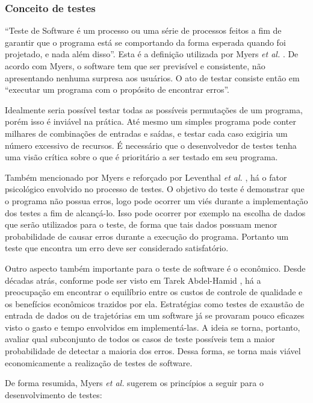 \hypertarget{conceito-de-testes}{%
\subsubsection{Conceito de testes}\label{conceito-de-testes}}

``Teste de Software é um processo ou uma série de processos feitos a fim de garantir que o programa está se comportando da forma esperada quando foi projetado, e nada além disso''. Esta é a definição utilizada por Myers \emph{et al.} \cite{myers}. De acordo com Myers, o software tem que ser previsível e consistente, não apresentando nenhuma surpresa aos usuários. O ato de testar consiste então em ``executar um programa com o propósito de encontrar erros''.

Idealmente seria possível testar todas as possíveis permutações de um programa, porém isso é inviável na prática. Até mesmo um simples programa pode conter milhares de combinações de entradas e saídas, e testar cada caso exigiria um número excessivo de recursos. É necessário que o desenvolvedor de testes tenha uma visão crítica sobre o que é prioritário a ser testado em seu programa.

Também mencionado por Myers e reforçado por Leventhal \emph{et al.} \cite{leventhal}, há o fator psicológico envolvido no processo de testes. O objetivo do teste é demonstrar que o programa não possua erros, logo pode ocorrer um viés durante a implementação dos testes a fim de alcançá-lo. Isso pode ocorrer por exemplo na escolha de dados que serão utilizados para o teste, de forma que tais dados possuam menor probabilidade de causar erros durante a execução do programa. Portanto um teste que encontra um erro deve ser considerado satisfatório.

Outro aspecto também importante para o teste de software é o econômico. Desde décadas atrás, conforme pode ser visto em Tarek Abdel-Hamid \cite{abdel}, há a preocupação em encontrar o equilíbrio entre os custos de controle de qualidade e os benefícios econômicos trazidos por ela. Estratégias como testes de exaustão de entrada de dados ou de trajetórias em um software já se provaram pouco eficazes visto o gasto e tempo envolvidos em implementá-las. A ideia se torna, portanto, avaliar qual subconjunto de todos os casos de teste possíveis tem a maior probabilidade de detectar a maioria dos erros. Dessa forma, se torna mais viável economicamente a realização de testes de software.

De forma resumida, Myers \emph{et al.} \cite{myers} sugerem os princípios a seguir para o desenvolvimento de testes:

